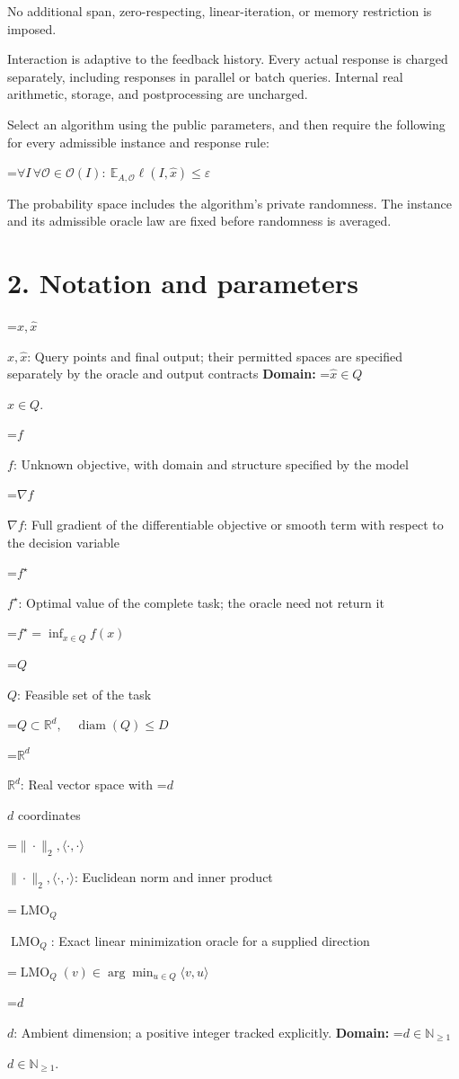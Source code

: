 \documentclass[10pt,a4paper]{article}
\newcommand{\AtlasMath}[1]{\par\begingroup\centering\setbox0=\hbox{$\displaystyle #1$}\ifdim\wd0>1.4\linewidth\typeout{ATLAS WIDE FORMULA: \the\wd0}\fi\ifdim\wd0>\linewidth\resizebox{\linewidth}{!}{\box0}\else\box0\fi\par\endgroup}
\newcommand{\AtlasInlineMath}[1]{\begingroup\setbox0=\hbox{$#1$}\ifdim\wd0>.4\linewidth\endgroup\AtlasMath{#1}\else\endgroup$#1$\fi}
\begin{document}
No additional span, zero-respecting, linear-iteration, or memory restriction is imposed.

Interaction is adaptive to the feedback history. Every actual response is charged separately, including responses in parallel or batch queries. Internal real arithmetic, storage, and postprocessing are uncharged.

Select an algorithm using the public parameters, and then require the following for every admissible instance and response rule:


\AtlasMath{\forall I\,\forall\mathcal{O}\in\mathcal{O}(I):\ \mathbb{E}_{A,\mathcal{O}}\ell(I,\widehat{x})\le\varepsilon}


The probability space includes the algorithm's private randomness. The instance and its admissible oracle law are fixed before randomness is averaged.

\section{2. Notation and parameters}
\AtlasInlineMath{x,\widehat{x}}: Query points and final output; their permitted spaces are specified separately by the oracle and output contracts \textbf{Domain:} \AtlasInlineMath{\widehat{x}\in Q}.

\AtlasInlineMath{f}: Unknown objective, with domain and structure specified by the model

\AtlasInlineMath{\nabla f}: Full gradient of the differentiable objective or smooth term with respect to the decision variable

\AtlasInlineMath{f^\star}: Optimal value of the complete task; the oracle need not return it


\AtlasMath{f^\star=\inf_{x\in Q}f(x)}


\AtlasInlineMath{Q}: Feasible set of the task


\AtlasMath{Q\subset\mathbb{R}^d,\quad\operatorname{diam}(Q)\le D}


\AtlasInlineMath{\mathbb{R}^d}: Real vector space with \AtlasInlineMath{d} coordinates

\AtlasInlineMath{\|\cdot\|_2,\langle\cdot,\cdot\rangle}: Euclidean norm and inner product

\AtlasInlineMath{\operatorname{LMO}_Q}: Exact linear minimization oracle for a supplied direction


\AtlasMath{\operatorname{LMO}_Q(v)\in\arg\min_{u\in Q}\langle v,u\rangle}


\AtlasInlineMath{d}: Ambient dimension; a positive integer tracked explicitly. \textbf{Domain:} \AtlasInlineMath{d\in\mathbb{N}_{\ge1}}.
\end{document}
